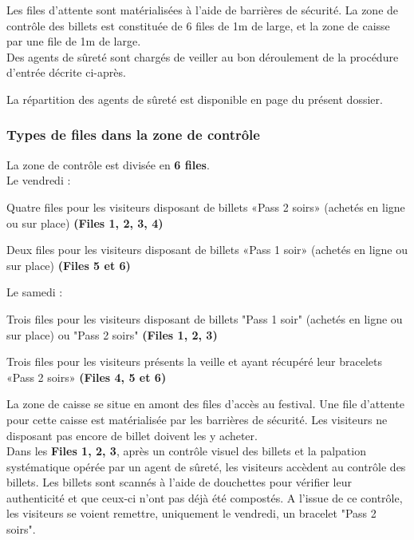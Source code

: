 \documentclass[hidelinks, paper=a4, fontsize=13pt]{report}
\begin{document}
Les files d’attente sont matérialisées à l’aide de barrières de sécurité. La zone de contrôle des billets est constituée de 6 files de 1m de large, et la zone de caisse par une file de 1m de large. \\

Des agents de sûreté sont chargés de veiller au bon déroulement de la procédure d’entrée décrite ci-après.

La répartition des agents de sûreté est disponible en page \pageref{refRepartitionAgentsDeSurete} du présent dossier. 

\subsubsection{Types de files dans la zone de contrôle}

La zone de contrôle est divisée en \textbf{6 files}.\\

Le vendredi : 
\begin{list}{•}{}
	\item Quatre files pour les visiteurs disposant de billets «Pass 2 soirs» (achetés en ligne ou sur place) \textbf{(Files 1, 2, 3, 4)}
	\item Deux files pour les visiteurs disposant de billets «Pass 1 soir» (achetés en ligne ou sur place) \textbf{(Files 5 et 6)}\\
\end{list}

Le samedi :
\begin{list}{•}{} 
	\item Trois files pour les visiteurs disposant de billets "Pass 1 soir" (achetés en ligne ou sur place) ou "Pass 2 soirs" \textbf{(Files 1, 2, 3)}
	\item Trois files pour les visiteurs présents la veille et ayant récupéré leur bracelets «Pass 2 soirs» \textbf{(Files 4, 5 et 6)}\\
\end{list}

La zone de caisse se situe en amont des files d'accès au festival. Une file d'attente pour cette caisse est matérialisée par les barrières de sécurité. Les visiteurs ne disposant pas encore de billet doivent les y acheter.\\

Dans les \textbf{Files 1, 2, 3}, après un contrôle visuel des billets et la palpation systématique opérée par un agent de sûreté, les visiteurs accèdent au contrôle des billets. Les billets sont scannés à l’aide de douchettes pour vérifier leur authenticité et que ceux-ci n’ont pas déjà été compostés. A l'issue de ce contrôle, les visiteurs se voient remettre, uniquement le vendredi, un bracelet "Pass 2 soirs".\\
\end{document}
